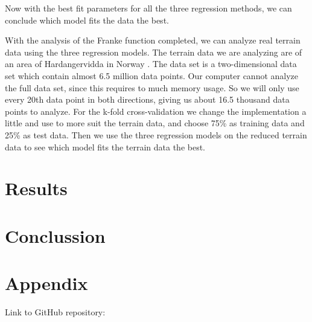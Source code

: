 \documentclass[12pt,a4paper,english]{article}
\begin{document}
Now with the best fit parameters for all the three regression methods, we can conclude which model fits the data the best.

With the analysis of the Franke function completed, we can analyze real terrain data using the three regression models. The terrain data we are analyzing are of an area of Hardangervidda in Norway \cite{earthexplorer}. The data set is a two-dimensional data set which contain almost 6.5 million data points. Our computer cannot analyze the full data set, since this requires to much memory usage. So we will only use every 20th data point in both directions, giving us about 16.5 thousand data points to analyze. For the k-fold cross-validation we change the implementation a little and use to more suit the terrain data, and choose 75\% as training data and 25\% as test data. Then we use the three regression models on the reduced terrain data to see which model fits the terrain data the best.

\section{Results}
\section{Conclussion}

\appendix
\section{Appendix}
\label{sect:appendix}
Link to GitHub repository:\\
\end{document}
